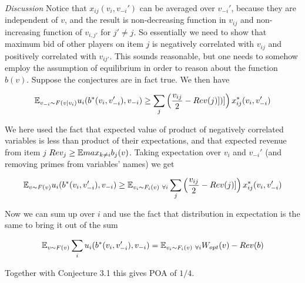 \textit{Discussion} Notice that $x_{ij}(v_i,v_{-i}')$ can be averaged over $v_{-i}'$, because they are independent of $v$, and the result is non-decreasing function in $v_{ij}$ and non-increasing function of $v_{i,j'}$ for $j'\neq j$. So essentially we need to show that maximum bid of other players on item $j$ is negatively correlated with $v_{ij}$ and positively correlated with $v_{ij'}$. This sounds reasonable, but one needs to somehow employ the assumption of equilibrium in order to reason about the function $b(v)$.
\bigskip
\newline Suppose the conjectures are in fact true. We then have

$${\mathbb{E}}_{v_{-i}\sim F(v|v_i)}u_i(b^*(v_i,v_{-i}'),v_{-i}) \geq \sum_j \left ( \frac{v_{ij}}{2}-Rev(j)])]\right)x^*_{ij}(v_i,v_{-i}')$$


We here used the fact that expected value of product of negatively correlated variables is less than product of their expectations, and that expected revenue from item $j$ $Rev_j\geq {\mathbb{E}} max_{k\neq i} b_j(v)$. Taking expectation over $v_i$ and $v_{-i}'$ (and removing primes from variables' names) we get

$${\mathbb{E}}_{v\sim F(v)}u_i(b^*(v_i,v_{-i}'),v_{-i}) \geq {\mathbb{E}}_{v_i\sim F_i(v)\ \forall i} \sum_j \left ( \frac{v_{ij}}{2}-Rev(j)]\right)x^*_{ij}(v_i,v_{-i}')$$

Now we can sum up over $i$ and use the fact that distribution in expectation is the same to bring it out of the sum

$${\mathbb{E}}_{v\sim F(v)}\sum_i u_i(b^*(v_i,v_{-i}'),v_{-i}) = {\mathbb{E}}_{v_i\sim F_i(v)\ \forall i}W_{opt}(v) - Rev(b)$$

Together with Conjecture 3.1 this gives POA of $1/4$.
